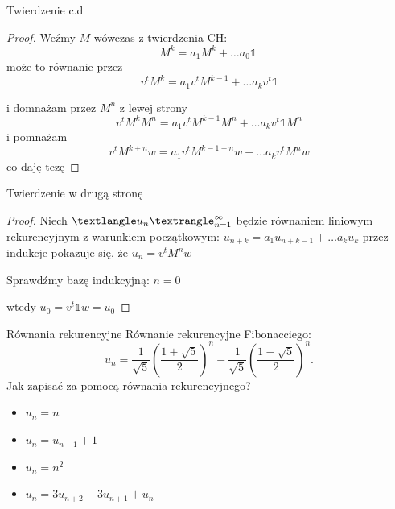 \documentclass[handout]{beamer}
\theoremstyle{definition}
\theoremstyle{named}
\begin{document}
\begin{frame}{Twierdzenie c.d}

\begin{proof}
    Weźmy $M$ wówczas z twierdzenia CH: 
    \begin{equation}
        M^{k} =  a_1 M^{k} + \ldots a_0 \mathbb{1} \
    \end{equation}
    może to równanie przez 
    \begin{equation}
        v^{t}M^{k} = a_1 v^{t} M^{k-1} + \ldots a_k v^{t} \mathbb{1} 
    \end{equation} 


i domnażam przez $M^{n}$ z lewej strony 
      \begin{equation}
          v^{t}M^{k} M^{n} = a_1 v^{t} M^{k-1} M^{n} + \ldots a_k v^{t} \mathbb{1} M^{n}
      \end{equation}
      i pomnażam 
      $$ v^{t}M^{k + n} w = a_1 v^{t} M^{k-1 + n}w + \ldots a_k v^{t} M^{n}w $$ 
      co daję tezę
\end{proof}
\end{frame}

\begin{frame}{Twierdzenie w drugą stronę}
\begin{proof}
    Niech $\textlangle u_n \textrangle_{n=1}^{\infty}$ będzie równaniem liniowym rekurencyjnym z warunkiem początkowym:
    $u_{n+k} = a_1 u_{n+k-1} + \ldots a_{k} u_{k}$
    przez indukcje pokazuje się, że $u_{n} = v^{t}M^{n}w $
    
    Sprawdźmy bazę indukcyjną:
    $n=0$
    
    wtedy $u_{0} = v^{t} \mathbb{1} w = u_0$
    
\end{proof}
\end{frame}



\begin{frame}{Równania rekurencyjne}
Równanie rekurencyjne Fibonacciego: 
$$
{\displaystyle u_{n}={\frac {1}{\sqrt {5}}}\left({\frac {1+{\sqrt {5}}}{2}}\right)^{n}-{\frac {1}{\sqrt {5}}}\left({\frac {1-{\sqrt {5}}}{2}}\right)^{n}.}
$$
 Jak zapisać za pomocą równania rekurencyjnego? 
\begin{itemize}
    \item  $u_n = n$
    \pause 
    \item $u_n = u_{n-1} + 1$
    \pause
    \item  $u_n = n^{2}$
    \pause
    \item $u_n = 3 u_{n+2} - 3u_{n+1} + u_n$

\end{itemize}

\end{frame}
\end{document}
